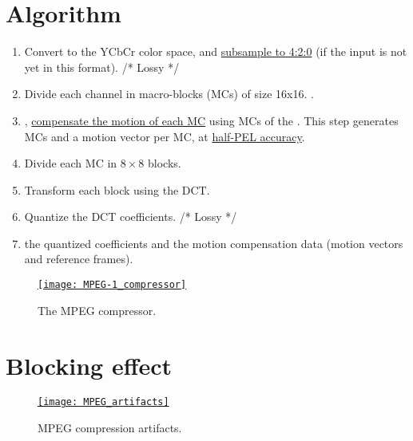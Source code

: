 \section{Algorithm}
\label{sec:MPEG-1_algo}
\begin{enumerate}
\item Convert to the \gls{YCbCr} color space, and
  \href{https://en.wikipedia.org/wiki/Chroma_subsampling}{subsample to
    4:2:0} (if the input is not yet in this format). /* Lossy */
\item Divide each channel in macro-blocks (MCs) of size 16x16. .
\item {},
  \href{https://en.wikipedia.org/wiki/Motion_compensation#Block_motion_compensation}{compensate
    the motion of each MC} using MCs of the . This step generates
   MCs and a motion vector per MC, at
  \href{https://en.wikipedia.org/wiki/Motion_compensation}{half-\gls{PEL}
    accuracy}.
\item Divide each MC in $8\times 8$ blocks.
\item Transform each block using the \gls{DCT}.
\item Quantize the \gls{DCT} coefficients. /* Lossy */
\item {} the quantized coefficients and the motion compensation
  data (motion vectors and reference frames).
\end{enumerate}

\begin{figure}[H]
  \vspace{-2ex}
  \centering
  \href{https://w3.ual.es/~vruiz/Docencia/Apuntes/Coding/Video/02-MPEG1/index.html}{\texttt{[image: MPEG-1\_compressor]}}
  \caption{The \gls{MPEG} compressor.}
  \label{fig:MPEG_compressor}
\end{figure}

\section{Blocking effect}
\begin{figure}[H]
  \vspace{-0ex}
  \centering
  \href{https://filmora.wondershare.com/video-editing/video-compression-artifacts.html}{\texttt{[image: MPEG\_artifacts]}}
  \caption{\gls{MPEG} compression artifacts.}
  \label{fig:MPEG_artifacts}
\end{figure}
